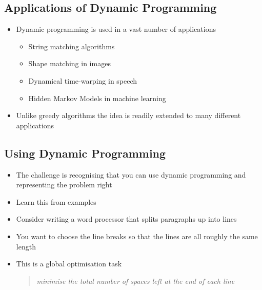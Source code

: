 \Outline %

\begin{slide}
\section{Applications of Dynamic Programming}

\begin{PauseHighLight}
  \begin{itemize}
  \item Dynamic programming is used in a vast number of applications
    \begin{itemize}
    \item String matching algorithms
    \item Shape matching in images
    \item Dynamical time-warping in speech
    \item Hidden Markov Models in machine learning\pause
    \end{itemize}
  \item Unlike greedy algorithms the idea is readily extended to many
    different applications\pause
  \end{itemize}
\end{PauseHighLight}

\end{slide}


\begin{slide}
\section[-2]{Using Dynamic Programming}
\begin{PauseHighLight}
  \begin{itemize}
  \item The challenge is recognising that you can use dynamic
    programming and representing the problem right\pause
  \item Learn this from examples\pause
  \item Consider writing a word processor that splits paragraphs up into
    lines\pause
  \item You want to choose the line breaks so that the lines are all
    roughly the same length\pause
  \item This is a global optimisation task
    \begin{quote}
      \textit{minimise the total number of spaces left at the end of
        each line}\pause
    \end{quote}
  \end{itemize}
\end{PauseHighLight}

\end{slide}

